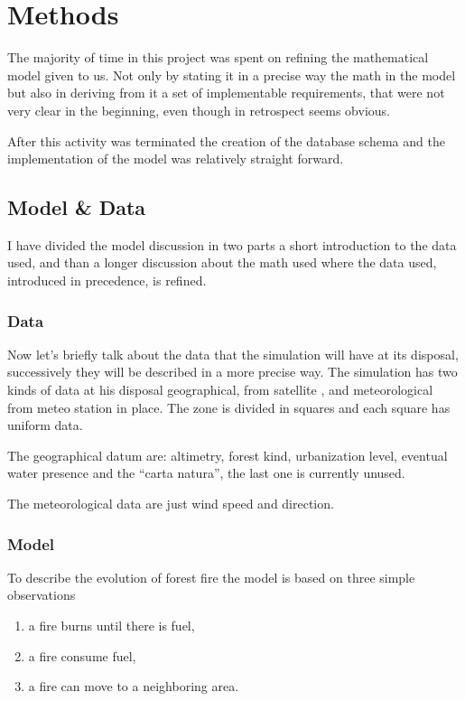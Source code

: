 \documentclass[Lau]{sapthesis} %
\let\oldsection\section
\let\oldsubsection\subsection
\def\subsubsection{\oldsubsection}
\def\subsection{\oldsection}
\def\section{\chapter}
\begin{document}
\section{Methods}%

The majority of time in this project was spent on refining the mathematical
model given to us. Not only by stating it in a precise way the math in the model
but also in deriving from it a set of implementable requirements, that were not
very clear in the beginning, even though in retrospect seems obvious.

After this activity was terminated the creation of the database schema and the
implementation of the model was relatively straight forward.

\subsection{Model \& Data}

I have divided the model discussion in two parts a short introduction to the
data used, and than a longer discussion about the math used where the data used,
introduced in precedence, is refined.

\subsubsection{Data}\label{sec:data}

Now let's briefly talk about the data that the simulation will have at its
disposal, successively they will be described in a more precise way. The
simulation has two kinds of data at his disposal geographical, from satellite
\cite{cop}, and meteorological from meteo station in place. The zone is divided
in squares and each square has uniform data.

The geographical datum are: altimetry, forest kind, urbanization level, eventual
water presence and the ``carta natura'', the last one is currently unused.

The meteorological data are just wind speed and direction.

\subsubsection{Model}

To describe the evolution of forest fire the model is based on three simple
observations

\begin{enumerate}
\item a fire burns until there is fuel,
\item a fire consume fuel,
\item a fire can move to a neighboring area.
\end{enumerate}
\end{document}
